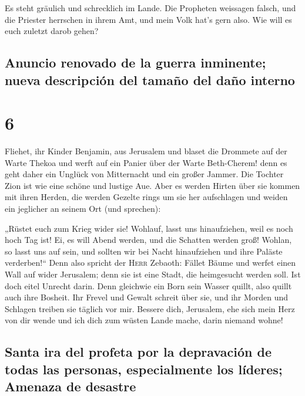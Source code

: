  Es steht gräulich und schrecklich im Lande.
 Die Propheten weissagen falsch, und die Priester
herrschen in ihrem Amt, und mein Volk hat's gern also. Wie will es euch
zuletzt darob gehen?

\hypertarget{anuncio-renovado-de-la-guerra-inminente-nueva-descripciuxf3n-del-tamauxf1o-del-dauxf1o-interno}{%
\subsection{Anuncio renovado de la guerra inminente; nueva descripción
del tamaño del daño
interno}\label{anuncio-renovado-de-la-guerra-inminente-nueva-descripciuxf3n-del-tamauxf1o-del-dauxf1o-interno}}

\hypertarget{section-5}{%
\section{6}\label{section-5}}

 Fliehet, ihr Kinder Benjamin, aus Jerusalem und blaset
die Drommete auf der Warte Thekoa und werft auf ein Panier über der
Warte Beth-Cherem! denn es geht daher ein Unglück von Mitternacht und
ein großer Jammer.  Die Tochter Zion ist wie eine schöne
und lustige Aue.  Aber es werden Hirten über sie kommen
mit ihren Herden, die werden Gezelte rings um sie her aufschlagen und
weiden ein jeglicher an seinem Ort (und sprechen):

 „Rüstet euch zum Krieg wider sie! Wohlauf, lasst uns
hinaufziehen, weil es noch hoch Tag ist! Ei, es will Abend werden, und
die Schatten werden groß!  Wohlan, so lasst uns auf sein,
und sollten wir bei Nacht hinaufziehen und ihre Paläste verderben!{}``
 Denn also spricht der \textsc{Herr} Zebaoth: Fället Bäume
und werfet einen Wall auf wider Jerusalem; denn sie ist eine Stadt, die
heimgesucht werden soll. Ist doch eitel Unrecht darin. 
Denn gleichwie ein Born sein Wasser quillt, also quillt auch ihre
Bosheit. Ihr Frevel und Gewalt schreit über sie, und ihr Morden und
Schlagen treiben sie täglich vor mir.  Bessere dich,
Jerusalem, ehe sich mein Herz von dir wende und ich dich zum wüsten
Lande mache, darin niemand wohne!

\hypertarget{santa-ira-del-profeta-por-la-depravaciuxf3n-de-todas-las-personas-especialmente-los-luxedderes-amenaza-de-desastre}{%
\subsection{Santa ira del profeta por la depravación de todas las
personas, especialmente los líderes; Amenaza de
desastre}\label{santa-ira-del-profeta-por-la-depravaciuxf3n-de-todas-las-personas-especialmente-los-luxedderes-amenaza-de-desastre}}

